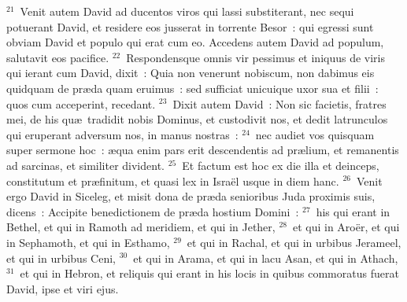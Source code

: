 ${}^{21}$~Venit autem David ad ducentos viros qui lassi substiterant, nec sequi potuerant David, et residere eos jusserat in torrente Besor~: qui egressi sunt obviam David et populo qui erat cum eo. Accedens autem David ad populum, salutavit eos pacifice.
${}^{22}$~Respondensque omnis vir pessimus et iniquus de viris qui ierant cum David, dixit~: Quia non venerunt nobiscum, non dabimus eis quidquam de pr\ae da quam eruimus~: sed sufficiat unicuique uxor sua et filii~: quos cum acceperint, recedant.
${}^{23}$~Dixit autem David~: Non sic facietis, fratres mei, de his qu\ae\ tradidit nobis Dominus, et custodivit nos, et dedit latrunculos qui eruperant adversum nos, in manus nostras~:
${}^{24}$~nec audiet vos quisquam super sermone hoc~: \ae qua enim pars erit descendentis ad pr\ae lium, et remanentis ad sarcinas, et similiter divident.
${}^{25}$~Et factum est hoc ex die illa et deinceps, constitutum et pr\ae finitum, et quasi lex in Isra\"el usque in diem hanc.
${}^{26}$~Venit ergo David in Siceleg, et misit dona de pr\ae da senioribus Juda proximis suis, dicens~: Accipite benedictionem de pr\ae da hostium Domini~:
${}^{27}$~his qui erant in Bethel, et qui in Ramoth ad meridiem, et qui in Jether,
${}^{28}$~et qui in Aro\"er, et qui in Sephamoth, et qui in Esthamo,
${}^{29}$~et qui in Rachal, et qui in urbibus Jerameel, et qui in urbibus Ceni,
${}^{30}$~et qui in Arama, et qui in lacu Asan, et qui in Athach,
${}^{31}$~et qui in Hebron, et reliquis qui erant in his locis in quibus commoratus fuerat David, ipse et viri ejus.

